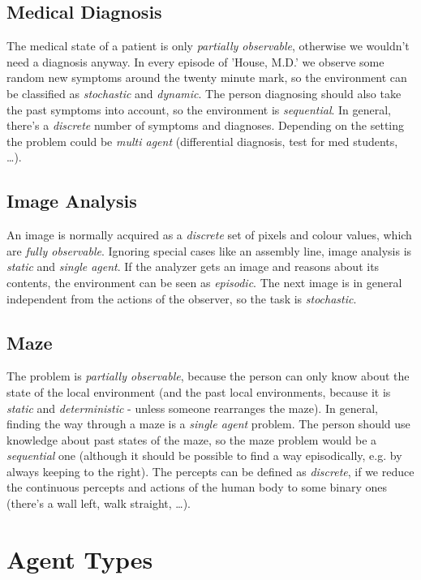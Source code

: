 \documentclass[11pt,a4paper]{scrartcl}
\begin{document}
\subsection{Medical Diagnosis}
The medical state of a patient is only \emph{partially observable}, otherwise we wouldn't need a diagnosis anyway. In every episode of 'House, M.D.' we observe some random new symptoms around the twenty minute mark, 
so the environment can be classified as \emph{stochastic} and \emph{dynamic}. The person diagnosing should also take the past symptoms into account, so the environment is \emph{sequential}. 
In general, there's a \emph{discrete} number of symptoms and diagnoses. Depending on the setting the problem could be \emph{multi agent} (differential diagnosis, test for med students, \ldots).

\subsection{Image Analysis}
An image is normally acquired as a \emph{discrete} set of pixels and colour values, which are \emph{fully observable}. Ignoring special cases like an assembly line, image analysis is \emph{static} and \emph{single agent}. 
If the analyzer gets an image and reasons about its contents, the environment can be seen as \emph{episodic}. The next image is in general independent from the actions of the observer, so the task is \emph{stochastic}.

\subsection{Maze}
The problem is \emph{partially observable}, because the person can only know about the state of the local environment 
(and the past local environments, because it is \emph{static} and \emph{deterministic} - unless someone rearranges the maze). 
In general, finding the way through a maze is a \emph{single agent} problem. The person should use knowledge about past states of the maze, 
so the maze problem would be a \emph{sequential} one (although it should be possible to find a way episodically, e.g. by always keeping to the right). 
The percepts can be defined as \emph{discrete}, if we reduce the continuous percepts and actions of the human body to some binary ones (there's a wall left, walk straight, \ldots). 


\section{Agent Types}
\end{document}
